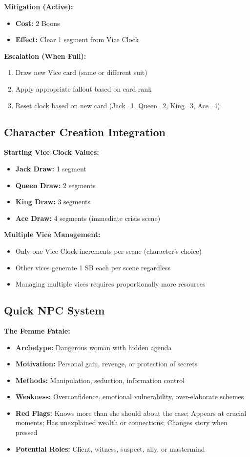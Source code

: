 \documentclass[11pt]{article}
\begin{document}
\textbf{Mitigation (Active):}
\begin{itemize}
    \item \textbf{Cost:} 2 Boons
    \item \textbf{Effect:} Clear 1 segment from Vice Clock
\end{itemize}

\textbf{Escalation (When Full):}
\begin{enumerate}
    \item Draw new Vice card (same or different suit)
    \item Apply appropriate fallout based on card rank
    \item Reset clock based on new card (Jack=1, Queen=2, King=3, Ace=4)
\end{enumerate}

\subsection{Character Creation Integration}

\textbf{Starting Vice Clock Values:}
\begin{itemize}
    \item \textbf{Jack Draw:} 1 segment
    \item \textbf{Queen Draw:} 2 segments
    \item \textbf{King Draw:} 3 segments  
    \item \textbf{Ace Draw:} 4 segments (immediate crisis scene)
\end{itemize}

\textbf{Multiple Vice Management:}
\begin{itemize}
    \item Only one Vice Clock increments per scene (character's choice)
    \item Other vices generate 1 SB each per scene regardless
    \item Managing multiple vices requires proportionally more resources
\end{itemize}

\subsection{Quick NPC System}

\textbf{The Femme Fatale:}
\begin{itemize}
    \item \textbf{Archetype:} Dangerous woman with hidden agenda
    \item \textbf{Motivation:} Personal gain, revenge, or protection of secrets
    \item \textbf{Methods:} Manipulation, seduction, information control
    \item \textbf{Weakness:} Overconfidence, emotional vulnerability, over-elaborate schemes
    \item \textbf{Red Flags:} Knows more than she should about the case; Appears at crucial moments; Has unexplained wealth or connections; Changes story when pressed
    \item \textbf{Potential Roles:} Client, witness, suspect, ally, or mastermind
\end{itemize}
\end{document}
